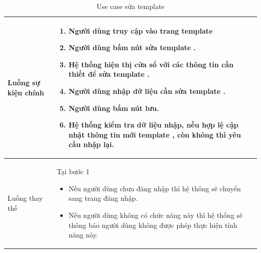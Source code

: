 \documentclass[12pt,a4paper]{article}
\begin{document}
\begin{table}[H]
\begin{tabular}{|p{3.5cm}|p{11.5cm}|c|}
            Luồng sự kiện chính & \vspace{-.8cm}\begin{enumerate}
                                                    \item Người dùng truy cập vào trang template
                                                    \item  Người dùng bấm nút sửa template .
                                                    \item  Hệ thống hiện thị cửa sổ với các thông tin cần thiết để sửa template .
                                                    \item  Người dùng nhập dữ liệu cần sửa template .
                                                    \item Người dùng bấm nút lưu.
                                                    \item Hệ thống kiểm tra dữ liệu nhập, nếu hợp lệ cập nhật thông tin mới template , còn không thì yêu cầu nhập lại.
            \end{enumerate}
            \\
            \hline
            Luồng thay thế & Tại bước 1\newline
            \vspace{-.8cm}\begin{itemize}
                              \item Nếu người dùng chưa đăng nhập thì hệ thống sẽ chuyển sang trang đăng nhập.
                              \item  Nếu người dùng không có chức năng này thì hệ thống sẽ thông báo người dùng không được phép thực hiện tính năng này.
            \end{itemize}
            \\
            \hline
        \end{tabular}
        \caption{Use case sửa template  }
    \end{table}


\end{document}
